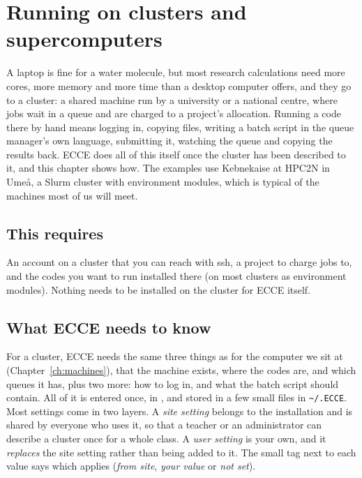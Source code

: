 \chapter{Running on clusters and supercomputers}
\label{ch:hpc}

A laptop is fine for a water molecule, but most research calculations need more cores, more memory and more time than a desktop computer offers, and they go to a cluster: a shared machine run by a university or a national centre, where jobs wait in a queue and are charged to a project's allocation. Running a code there by hand means logging in, copying files, writing a batch script in the queue manager's own language, submitting it, watching the queue and copying the results back. ECCE does all of this itself once the cluster has been described to it, and this chapter shows how. The examples use Kebnekaise at HPC2N in Umeå, a Slurm cluster with environment modules, which is typical of the machines most of us will meet.

\section*{This requires}
An account on a cluster that you can reach with ssh, a project to charge jobs to, and the codes you want to run installed there (on most clusters as environment modules). Nothing needs to be installed on the cluster for ECCE itself.

\section{What ECCE needs to know}
For a cluster, ECCE needs the same three things as for the computer we sit at (Chapter~\ref{ch:machines}), that the machine exists, where the codes are, and which queues it has, plus two more: how to log in, and what the batch script should contain. All of it is entered once, in , and stored in a few small files in \texttt{\textasciitilde/.ECCE}. Most settings come in two layers. A \emph{site setting} belongs to the installation and is shared by everyone who uses it, so that a teacher or an administrator can describe a cluster once for a whole class. A \emph{user setting} is your own, and it \emph{replaces} the site setting rather than being added to it. The small tag next to each value says which applies (\emph{from site}, \emph{your value} or \emph{not set}).


